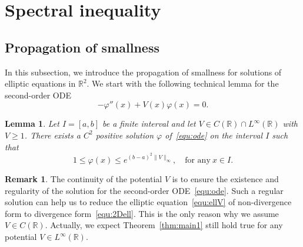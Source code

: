 \documentclass[a4paper,reqno]{amsart}
\newtheorem{lemma}[theorem]{Lemma}
\theoremstyle{definition}
\newtheorem{remark}[theorem]{Remark}
\numberwithin{equation}{section}
\newcommand{\R}{\mathbb{R}}
\def \R {{\mathbb{R} }}
\begin{document}
  

\section{Spectral inequality}\label{SS:SPEC}


\subsection{Propagation of smallness}
In this subsection, we introduce the propagation of smallness for solutions of elliptic equations in $\R^{2}$. We start with the following technical lemma for the second-order ODE
\begin{equation}\label{equ:ode}
-\varphi''(x)+V(x)\varphi(x)=0.
\end{equation}
\begin{lemma}\label{le:ODE}
Let $I=[a,b]$ be a finite interval and let $V\in C(\R)\cap L^{\infty}(\R)$ with $V\ge 1$. There exists a $C^{2}$ positive solution $\varphi$ of~\eqref{equ:ode} on the interval $I$ such that 
\begin{equation*}
1\le \varphi(x)\le e^{(b-a)^{2}\|V\|_{{\infty}}},\quad \mbox{for any}\ x\in I.
\end{equation*}
\end{lemma}

\begin{remark}
The continuity of the potential $V$ is to ensure the existence and regularity of the solution for the second-order ODE~\eqref{equ:ode}. Such a regular solution can help us to reduce the elliptic equation~\eqref{equ:ellV} of non-divergence form to divergence form~\eqref{equ:2Dell}. This is the only reason why we assume $V\in C(\R)$. Actually, we expect Theorem~\ref{thm:main1} still hold true for any potential $V\in L^{\infty}(\R)$.
\end{remark}
\end{document}
